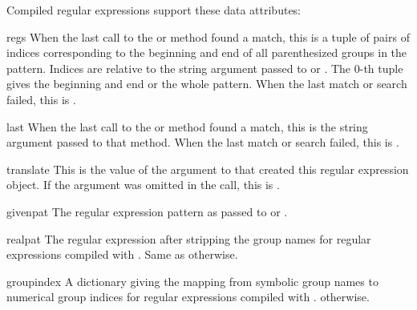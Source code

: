 \noindent
Compiled regular expressions support these data attributes:

\renewcommand{\indexsubitem}{(regex attribute)}

\begin{datadesc}{regs}
When the last call to the  or  method found a
match, this is a tuple of pairs of indices corresponding to the
beginning and end of all parenthesized groups in the pattern.  Indices
are relative to the string argument passed to  or
.  The 0-th tuple gives the beginning and end or the
whole pattern.  When the last match or search failed, this is
.
\end{datadesc}

\begin{datadesc}{last}
When the last call to the  or  method found a
match, this is the string argument passed to that method.  When the
last match or search failed, this is .
\end{datadesc}

\begin{datadesc}{translate}
This is the value of the  argument to
 that created this regular expression object.  If
the  argument was omitted in the 
call, this is .
\end{datadesc}

\begin{datadesc}{givenpat}
The regular expression pattern as passed to  or
.
\end{datadesc}

\begin{datadesc}{realpat}
The regular expression after stripping the group names for regular
expressions compiled with .  Same as 
otherwise.
\end{datadesc}

\begin{datadesc}{groupindex}
A dictionary giving the mapping from symbolic group names to numerical
group indices for regular expressions compiled with .
 otherwise.
\end{datadesc}
